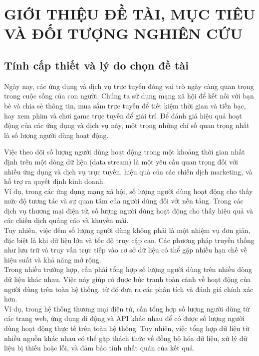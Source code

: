 \documentclass[a4paper,13pt]{article}
\theoremstyle{mytheor}
\begin{document}



\renewcommand{\contentsname}{Content}
\newpage
\vspace{1cm}
\tableofcontents
\newpage
\section{GIỚI THIỆU ĐỀ TÀI, MỤC TIÊU VÀ ĐỐI TƯỢNG NGHIÊN CỨU}
\subsection{Tính cấp thiết và lý do chọn đề tài}
\hspace{2em}Ngày nay, các ứng dụng và dịch vụ trực tuyến đóng vai trò ngày càng quan trọng trong cuộc sống của con người. 
Chúng ta sử dụng mạng xã hội để kết nối với bạn bè và chia sẻ thông tin, mua sắm trực tuyến để tiết kiệm thời gian và tiền bạc, 
hay xem phim và chơi game trực tuyến để giải trí. Để đánh giá hiệu quả hoạt động của các ứng dụng và dịch vụ này, 
một trọng những chỉ số quan trọng nhất là số lượng người dùng hoạt động.

Việc theo dõi số lượng người dùng hoạt động trong một khoảng thời gian nhất định trên một dòng dữ liệu (data stream) 
là một yêu cầu quan trọng đối với nhiều ứng dụng và dịch vụ trực tuyến, hiệu quả của các chiến dịch marketing, 
và hỗ trợ ra quyết định kinh doanh.\\
Ví dụ, trong các ứng dụng mạng xã hội, số lượng người dùng hoạt động cho thấy mức độ tương tác 
và sự quan tâm của người dùng đối với nền tảng. Trong các dịch vụ thương mại điện tử, số lượng người dùng hoạt động cho thấy hiệu quả 
và các chiến dịch quảng cáo và khuyến mãi. \\
Tuy nhiên, việc đếm số lượng người dùng không phải là một nhiệm vụ đơn giản, đặc biệt là khi dữ liệu lớn 
và tốc độ truy cập cao. Các phương pháp truyền thống như lưu trữ và truy vấn trực tiếp vào cơ sở dữ liệu có thể gặp nhiều hạn chế về hiệu suất 
và khả năng mở rộng.\\

Trong nhiều trường hợp, cần phải tổng hợp số lượng người dùng trên nhiều dòng dữ liệu khác nhau. Việc này giúp có được bức tranh toàn cảnh về hoạt động 
của người dùng trên toàn hệ thống, từ đó đưa ra các phân tích và đánh giá chính xác hơn.\\
Ví dụ, trong hệ thống thương mại điện tử, cần tổng hợp số lượng người dùng từ các trang web, ứng dụng di động và API khác nhau để có được số lượng 
người dùng hoạt động thực tế trên toàn hệ thống. 
Tuy nhiên, việc tổng hợp dữ liệu từ nhiều nguồn khác nhau có thể gặp thách thức về đồng bộ hóa dữ liệu, xử lý dữ liệu bị thiếu hoặc lỗi, 
và đảm bảo tính nhất quán của kết quả. 
\end{document}
